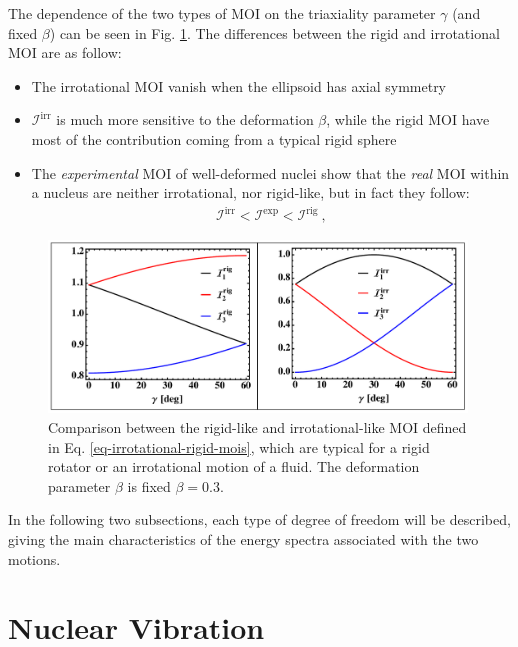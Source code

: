 The dependence of the two types of MOI on the triaxiality parameter $\gamma$ (and fixed $\beta$) can be seen in Fig. \ref{fig-irrotational-rigid-mois}. The differences between the rigid and irrotational MOI are as follow:
\begin{itemize}
    \item The irrotational MOI vanish when the ellipsoid has axial symmetry
    \item $\mathcal{I}^\text{irr}$ is much more sensitive to the deformation $\beta$, while the rigid MOI have most of the contribution coming from a typical rigid sphere
    \item The \emph{experimental} MOI of well-deformed nuclei show that the \emph{real} MOI within a nucleus are neither irrotational, nor rigid-like, but in fact they follow:
    \begin{align}
        \mathcal{I}^\text{irr}<\mathcal{I}^\text{exp}<\mathcal{I}^\text{rig}\ ,
        \label{experimental-MOI-vs-rig-irr}
    \end{align}
\end{itemize}
\begin{figure}
    \centering
    \includegraphics[width=0.99\textwidth]{Chapters/Figures/mois_rig_irr.pdf}
    \caption{Comparison between the rigid-like and irrotational-like MOI defined in Eq. \ref{eq-irrotational-rigid-mois}, which are typical for a rigid rotator or an irrotational motion of a fluid. The deformation parameter $\beta$ is fixed $\beta=0.3$.}
    \label{fig-irrotational-rigid-mois}
\end{figure}

In the following two subsections, each type of degree of freedom will be described, giving the main characteristics of the energy spectra associated with the two motions. 

\section{Nuclear Vibration}

